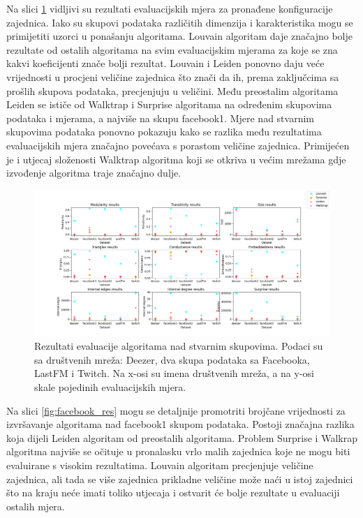 Na slici \ref{fig:test3} vidljivi su rezultati evaluacijskih mjera za pronađene konfiguracije zajednica. Iako su skupovi podataka različitih dimenzija i karakteristika mogu se primijetiti uzorci u ponašanju algoritama. Louvain algoritam daje značajno bolje rezultate od ostalih algoritama na svim evaluacijskim mjerama za koje se zna kakvi koeficijenti znače bolji rezultat. Louvain i Leiden ponovno daju veće vrijednosti u procjeni veličine zajednica što znači da ih, prema zaključcima sa prošlih skupova podataka, precjenjuju u veličini. Među preostalim algoritama Leiden se ističe od Walktrap i Surprise algoritama na određenim skupovima podataka i mjerama, a najviše na skupu facebook1. Mjere nad stvarnim skupovima podataka ponovno pokazuju kako se razlika među rezultatima evaluacijskih mjera značajno povećava s porastom veličine zajednica. Primijećen je i utjecaj složenosti Walktrap algoritma koji se otkriva u većim mrežama gdje izvođenje algoritma traje značajno dulje.


\begin{figure}
	\includegraphics[width=\linewidth]{images/test3.png}
	\caption{Rezultati evaluacije algoritama nad stvarnim skupovima. Podaci su sa društvenih mreža: Deezer, dva skupa podataka sa Facebooka, LastFM i Twitch. Na x-osi su imena društvenih mreža, a na y-osi skale pojedinih evaluacijskih mjera.}
	\label{fig:test3}
\end{figure}


Na slici \ref{fig:facebook_res} mogu se detaljnije promotriti brojčane vrijednosti za izvršavanje algoritama nad facebook1 skupom podataka. Postoji značajna razlika koja dijeli Leiden algoritam od preostalih algoritama. Problem Surprise i Walkrap algoritma najviše se očituje u pronalasku vrlo malih zajednica koje ne mogu biti evaluirane s visokim rezultatima. Louvain algoritam precjenjuje veličine zajednica, ali tada se više zajednica prikladne veličine može naći u istoj zajednici što na kraju neće imati toliko utjecaja i ostvarit će bolje rezultate u evaluaciji ostalih mjera.



